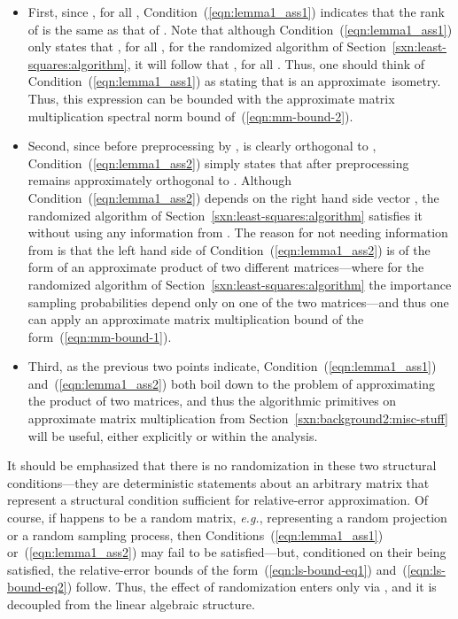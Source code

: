 \documentclass[twoside]{article}
\begin{document}
\begin{itemize}
\item
First, since , for all , 
Condition~(\ref{eqn:lemma1_ass1}) indicates that the rank of  is the
same as that of .
Note that although Condition~(\ref{eqn:lemma1_ass1}) only states that 
, for all , for the randomized 
algorithm of Section~\ref{sxn:least-squares:algorithm}, it will follow that 
, for all .
Thus, one should think of Condition~(\ref{eqn:lemma1_ass1}) as stating 
that  is an approximate~isometry. 
Thus, this expression can be bounded with the approximate matrix multiplication 
spectral norm bound of~(\ref{eqn:mm-bound-2}).
\item
Second, since before preprocessing by , 
 is clearly orthogonal to , 
Condition~(\ref{eqn:lemma1_ass2}) simply states that after preprocessing
 remains approximately orthogonal
to . 
Although Condition~(\ref{eqn:lemma1_ass2}) depends on the right hand 
side vector , the randomized algorithm of 
Section~\ref{sxn:least-squares:algorithm} satisfies it without using any 
information from .
The reason for not needing information from  is that the left hand side 
of Condition~(\ref{eqn:lemma1_ass2}) is of the form of an approximate 
product of two different matrices---where for the randomized algorithm of
Section~\ref{sxn:least-squares:algorithm} the importance sampling 
probabilities depend only on one of the two matrices---and thus one can apply an
approximate matrix multiplication bound of the form~(\ref{eqn:mm-bound-1}).
\item
Third, as the previous two points indicate, 
Condition~(\ref{eqn:lemma1_ass1}) and~(\ref{eqn:lemma1_ass2}) 
both boil down to the problem of approximating the product of two matrices,
and thus the algorithmic primitives on approximate matrix multiplication 
from Section~\ref{sxn:background2:misc-stuff} will be useful, either 
explicitly or within the analysis.
\end{itemize}
It should be emphasized that there is no randomization in these two 
structural conditions---they are 
deterministic statements about an arbitrary matrix  that represent a 
structural condition sufficient for relative-error approximation.
Of course, if  happens to be a random matrix, \emph{e.g.}, representing 
a random projection or a random sampling process, then 
Conditions~(\ref{eqn:lemma1_ass1}) or~(\ref{eqn:lemma1_ass2}) may fail to 
be satisfied---but, conditioned on their being satisfied, the 
relative-error bounds of the form~(\ref{eqn:ls-bound-eq1}) 
and~(\ref{eqn:ls-bound-eq2}) follow.
Thus, the effect of randomization enters only via , and it is decoupled 
from the linear algebraic structure. 
\end{document}
